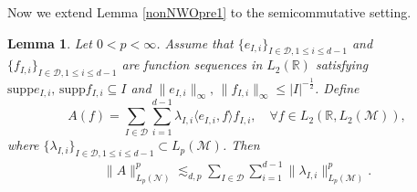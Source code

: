 \documentclass[oneside,english,a4wide]{amsart}
\numberwithin{equation}{section}
\numberwithin{figure}{section}
\theoremstyle{plain}
\theoremstyle{plain}
\theoremstyle{definition}
\theoremstyle{plain}
\newtheorem{lemma}[thm]{Lemma}
\theoremstyle{remark}
\theoremstyle{definition}
\theoremstyle{remark}
\theoremstyle{definition}
\newcommand{\8}{\infty}
\begin{document}
Now we extend Lemma \ref{nonNWOpre1} to the semicommutative setting.
\begin{lemma}\label{nonNWOpre}
	Let $0<p<\infty$. Assume that $\{e_{I,i}\}_{I\in\mathcal{D},1\le i\le d-1}$ and $\{f_{I,i}\}_{I\in\mathcal{D},1\le i\le d-1}$ are function sequences in $L_2(\mathbb{R})$ satisfying $\mathrm{supp}e_{I,i}, \,\mathrm{supp}f_{I,i}\subseteq I$ and
	$\|e_{I,i}\|_{\infty},\,\|f_{I,i}\|_{\infty}\le |I|^{-\frac{1}{2}}$. Define
	\begin{equation*}
		A(f)=\sum_{I\in \mathcal{D}}\sum_{i=1}^{d-1} \lambda_{I,i} \langle e_{I,i},f\rangle f_{I,i},\quad \forall f\in L_2(\mathbb{R},L_2(\mathcal{M})),
	\end{equation*}
	where $\{\lambda_{I,i}\}_{I\in\mathcal{D},1\le i\le d-1}\subset L_p(\mathcal{M})$.
	Then
	\begin{equation*}
		\begin{aligned}
			\|A\|^p_{L_p(\mathcal{N})}\lesssim_{d,p}	\sum_{I\in\mathcal{D}}\sum_{i=1}^{d-1}\|\lambda_{I,i}\|^p_{L_p(\mathcal{M})}.
		\end{aligned}
	\end{equation*}
\end{lemma}
\end{document}
